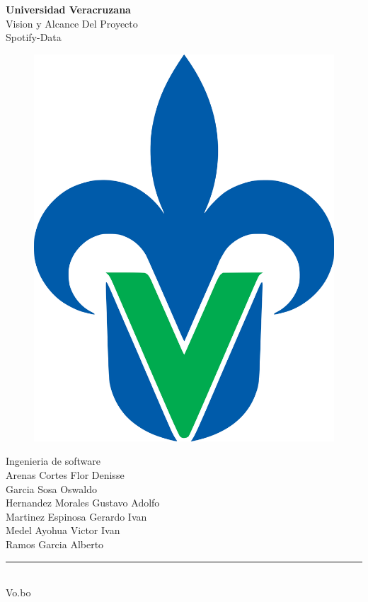 \begin{titlepage}
	\begin{center}
	{\huge \textbf{Universidad Veracruzana}}\\
	\vspace{2cm}  
	{\Large {Vision y Alcance Del Proyecto}}\\
	\vspace{5mm}	
	{\Large {Spotify-Data}}\\
	\begin{figure}[h]
		\centering
		\includegraphics[scale=0.10]{uvlogo}
	\end{figure}
	{\Large {Ingenieria de software}}\\
    \vspace{2cm}
	{\Large {Arenas Cortes Flor Denisse}}\\
	\vspace{5mm}	
	{\Large {Garcia Sosa Oswaldo }}\\
	\vspace{5mm}	
	{\Large {Hernandez Morales Gustavo Adolfo }}\\
	\vspace{5mm}	
	{\Large {Martinez Espinosa Gerardo Ivan}}\\
	\vspace{5mm}	
	{\Large {Medel Ayohua Victor Ivan}}\\
	\vspace{3mm}	
	{\Large {Ramos Garcia Alberto}}\\
	\vspace{2cm}	
    \rule{8cm}{0.5mm} \\ \Large Vo.bo\\ 
	\end{center}
\end{titlepage}